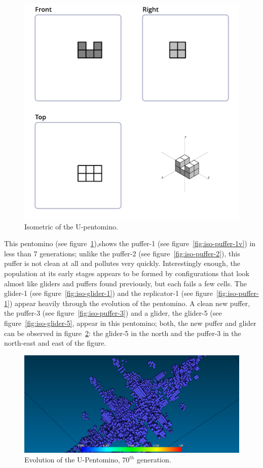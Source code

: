 \begin{figure}[H]
	\centering
	\includegraphics[scale=0.3]{iso_diagrams/u.png}
	\caption{Isometric of the U-pentomino.}
	\label{fig:iso-pent-u}
\end{figure}

This pentomino (see figure~\ref{fig:iso-pent-u}),shows the puffer-1 (see
figure~\ref{fig:iso-puffer-1v}) in less than 7 generations; unlike the puffer-2
(see figure~\ref{fig:iso-puffer-2}), this puffer is not clean at all and
pollutes very quickly. Interestingly enough, the population at its early stages
appears to be formed by configurations that look almost like gliders and puffers
found previously, but each fails a few cells. The glider-1 (see
figure~\ref{fig:iso-glider-1}) and the replicator-1 (see
figure~\ref{fig:iso-puffer-1}) appear heavily through the evolution of the
pentomino. A clean new puffer, the puffer-3 (see figure~\ref{fig:iso-puffer-3})
and a glider, the glider-5 (see figure~\ref{fig:iso-glider-5}, appear in this
pentomino; both, the new puffer and glider can be observed in
figure~\ref{fig:ss-pent:u-70}: the glider-5 in the north and the puffer-3 in the
north-east and east of the figure.

\begin{figure}[H]
	\centering
	\includegraphics[scale=0.3]{pentominoes_ss/u_70.png}
	\caption{Evolution of the U-Pentomino, $70^{th}$ generation.}
	\label{fig:ss-pent:u-70}
\end{figure}

